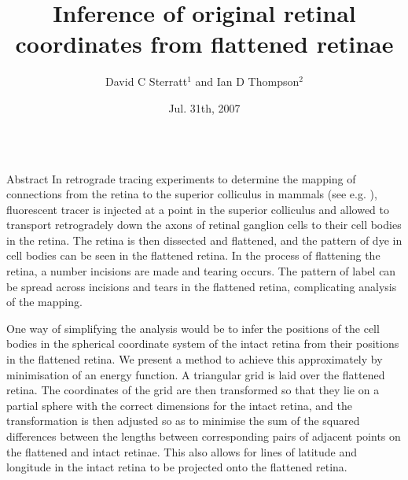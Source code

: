 \documentclass[final,hyperref={pdfpagelabels=false}]{beamer}
\title{Inference of original retinal coordinates from flattened
  retinae} \author{David C Sterratt$^1$ and Ian D Thompson$^2$}
\institute{$^1$Institute for Adaptive \& Neural Computation, School of
  Informatics, University of Edinburgh\\ $^2$MRC Centre for Developmental
  Neurobiology, King's College London} \date{Jul. 31th, 2007}
\newcommand{\figack}[1]{{\par\small\vskip -0.5ex\hfill{\color{blue} #1}\par}}
\begin{document}
\begin{frame}{} 
  \begin{columns}[T]

    \begin{column}{.33\linewidth}

      \begin{block}{Abstract}
        In retrograde tracing experiments to determine the mapping of
        connections from the retina to the superior colliculus in
        mammals (see e.g. \citealp{RashEtal05oppo}), fluorescent
        tracer is injected at a point in the superior colliculus and
        allowed to transport retrogradely down the axons of retinal
        ganglion cells to their cell bodies in the retina. The retina
        is then dissected and flattened, and the pattern of dye in
        cell bodies can be seen in the flattened retina. In the
        process of flattening the retina, a number incisions are made
        and tearing occurs. The pattern of label can be spread across
        incisions and tears in the flattened retina, complicating
        analysis of the mapping.

        One way of simplifying the analysis would be to infer the
        positions of the cell bodies in the spherical coordinate
        system of the intact retina from their positions in the
        flattened retina. We present a method to achieve this
        approximately by minimisation of an energy function. A
        triangular grid is laid over the flattened retina. The
        coordinates of the grid are then transformed so that they lie
        on a partial sphere with the correct dimensions for the intact
        retina, and the transformation is then adjusted so as to
        minimise the sum of the squared differences between the
        lengths between corresponding pairs of adjacent points on the
        flattened and intact retinae. This also allows for lines of
        latitude and longitude in the intact retina to be projected
        onto the flattened retina.
      \end{block}
      

\end{column}
\end{columns}
\end{frame}
\end{document}

